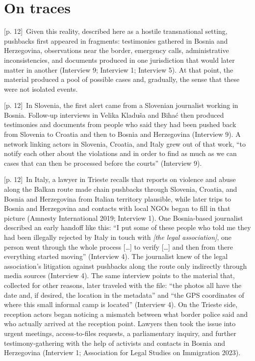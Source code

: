 \documentclass[10pt,a4paper]{article}
\begin{document}
\section*{On traces}
{\scriptsize\color{gray} [p. 12]}\ Given this reality, described here as a hostile transnational setting, pushbacks first appeared in fragments: testimonies gathered in Bosnia and Herzegovina, observations near the border, emergency calls, administrative inconsistencies, and documents produced in one jurisdiction that would later matter in another (Interview 9; Interview 1; Interview 5). At that point, the material produced a pool of possible cases and, gradually, the sense that these were not isolated events.\par
{\scriptsize\color{gray} [p. 12]}\ In Slovenia, the first alert came from a Slovenian journalist working in Bosnia. Follow-up interviews in Velika Kladuša and Bihać then produced testimonies and documents from people who said they had been pushed back from Slovenia to Croatia and then to Bosnia and Herzegovina (Interview 9). A network linking actors in Slovenia, Croatia, and Italy grew out of that work, “to notify each other about the violations and in order to find as much as we can cases that can then be processed before the courts” (Interview 9).\par
{\scriptsize\color{gray} [p. 12]}\ In Italy, a lawyer in Trieste recalls that reports on violence and abuse along the Balkan route made chain pushbacks through Slovenia, Croatia, and Bosnia and Herzegovina from Italian territory plausible, while later trips to Bosnia and Herzegovina and contacts with local NGOs began to fill in that picture (Amnesty International 2019; Interview 1). One Bosnia-based journalist described an early handoff like this: “I put some of these people who told me they had been illegally rejected by Italy in touch with \textit{[the legal association]}, one person went through the whole process […] to verify […] and then from there everything started moving” (Interview 4). The journalist knew of the legal association’s litigation against pushbacks along the route only indirectly through media sources (Interview 4). The same interview points to the material that, collected for other reasons, later traveled with the file: “the photos all have the date and, if desired, the location in the metadata” and “the GPS coordinates of where this small informal camp is located” (Interview 4). On the Trieste side, reception actors began noticing a mismatch between what border police said and who actually arrived at the reception point. Lawyers then took the issue into urgent meetings, access-to-files requests, a parliamentary inquiry, and further testimony-gathering with the help of activists and contacts in Bosnia and Herzegovina (Interview 1; Association for Legal Studies on Immigration 2023).\par
\end{document}
